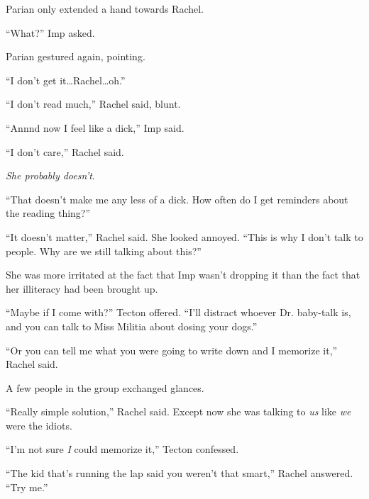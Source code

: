 Parian only extended a hand towards Rachel.



``What?'' Imp asked.



Parian gestured again, pointing.



``I don't get it\ldots Rachel\ldots oh.''



``I don't read much,'' Rachel said, blunt.



``Annnd now I feel like a dick,'' Imp said.



``I don't care,'' Rachel said.



\emph{She probably doesn't}.



``That doesn't make me any less of a dick.  How often do I get reminders about the reading thing?''



``It doesn't matter,'' Rachel said.  She looked annoyed.  ``This is why I don't talk to people.  Why are we still talking about this?''



She was more irritated at the fact that Imp wasn't dropping it than the fact that her illiteracy had been brought up.



``Maybe if I come with?'' Tecton offered.  ``I'll distract whoever Dr. baby-talk is, and you can talk to Miss Militia about dosing your dogs.''



``Or you can tell me what you were going to write down and I memorize it,'' Rachel said.



A few people in the group exchanged glances.



``Really simple solution,'' Rachel said.  Except now she was talking to \emph{us} like \emph{we} were the idiots.



``I'm not sure \emph{I} could memorize it,'' Tecton confessed.



``The kid that's running the lap said you weren't that smart,'' Rachel answered.  ``Try me.''



